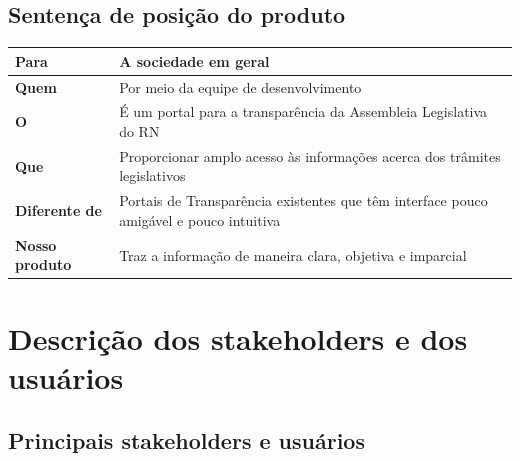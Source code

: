 \documentclass[12pt, a4paper]{article}
\begin{document}
        \subsection{Sentença de posição do produto}
            \begin{longtabu}{X[-1] | X}
                \hline
                \textbf{Para} &
                A sociedade em geral
                \\ \hline

                \textbf{Quem} &
                Por meio da equipe de desenvolvimento
                \\ \hline

                \textbf{O} &
                É um portal para a transparência da Assembleia Legislativa do RN
                \\ \hline

                \textbf{Que} &
                Proporcionar amplo acesso às informações acerca dos trâmites
                legislativos
                \\ \hline

                \textbf{Diferente de} &
                Portais de Transparência existentes que têm interface pouco
                amigável e pouco intuitiva
                \\ \hline

                \textbf{Nosso produto} &
                Traz a informação de maneira clara, objetiva e imparcial
                \\ \hline
            \end{longtabu}

    \section{Descrição dos stakeholders e dos usuários}
        \subsection{Principais stakeholders e usuários}
\end{document}
